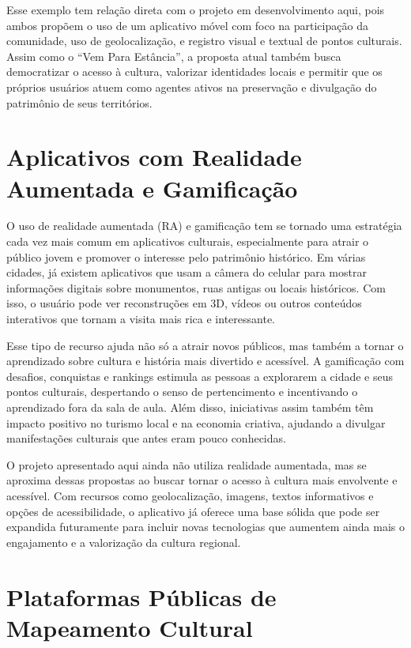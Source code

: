 Esse exemplo tem relação direta com o projeto em desenvolvimento aqui, pois ambos propõem o uso de um aplicativo móvel com foco na participação da comunidade, uso de geolocalização, e registro visual e textual de pontos culturais. Assim como o “Vem Para Estância”, a proposta atual também busca democratizar o acesso à cultura, valorizar identidades locais e permitir que os próprios usuários atuem como agentes ativos na preservação e divulgação do patrimônio de seus territórios.

\section{Aplicativos com Realidade Aumentada e Gamificação}

O uso de realidade aumentada (RA) e gamificação tem se tornado uma estratégia cada vez mais comum em aplicativos culturais, especialmente para atrair o público jovem e promover o interesse pelo patrimônio histórico. Em várias cidades, já existem aplicativos que usam a câmera do celular para mostrar informações digitais sobre monumentos, ruas antigas ou locais históricos. Com isso, o usuário pode ver reconstruções em 3D, vídeos ou outros conteúdos interativos que tornam a visita mais rica e interessante. \cite{soster2021tecnologias}

Esse tipo de recurso ajuda não só a atrair novos públicos, mas também a tornar o aprendizado sobre cultura e história mais divertido e acessível. A gamificação com desafios, conquistas e rankings estimula as pessoas a explorarem a cidade e seus pontos culturais, despertando o senso de pertencimento e incentivando o aprendizado fora da sala de aula. Além disso, iniciativas assim também têm impacto positivo no turismo local e na economia criativa, ajudando a divulgar manifestações culturais que antes eram pouco conhecidas.

O projeto apresentado aqui ainda não utiliza realidade aumentada, mas se aproxima dessas propostas ao buscar tornar o acesso à cultura mais envolvente e acessível. Com recursos como geolocalização, imagens, textos informativos e opções de acessibilidade, o aplicativo já oferece uma base sólida que pode ser expandida futuramente para incluir novas tecnologias que aumentem ainda mais o engajamento e a valorização da cultura regional.

\section{Plataformas Públicas de Mapeamento Cultural}

